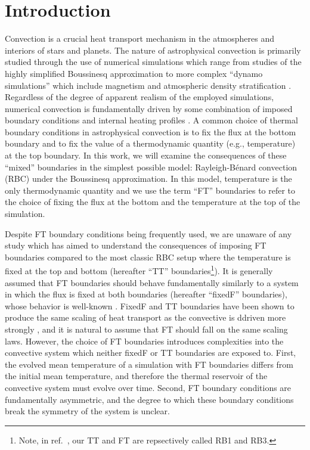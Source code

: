 \documentclass[aps, pre, onecolumn, nofootinbib, notitlepage, groupedaddress, amsfonts, amssymb, amsmath, longbibliography, superscriptaddress]{revtex4-1}
\newcommand{\RB}{Rayleigh-B\'{e}nard }
\begin{document}

\section{Introduction}
\label{sec:introduction}
Convection is a crucial heat transport mechanism in the atmospheres and interiors of stars and planets.
The nature of astrophysical convection is primarily studied through the use of numerical simulations which range from studies of the highly simplified Boussinesq approximation \cite{spiegel&veronis1960} to more complex ``dynamo simulations'' which include magnetism and atmospheric density stratification \cite{charbonneau2014, toomre2019}.
Regardless of the degree of apparent realism of the employed simulations, numerical convection is fundamentally driven by some combination of imposed boundary conditions and internal heating profiles \cite{goluskin2015}.
A common choice of thermal boundary conditions in astrophysical convection \cite{glatzmaier&gilman1982, hurlburt&all1986, cattaneo&all1990, featherstone&hindman2016a, korre&all2019, wood&brummell2018, kapyla&all2019} is to fix the flux at the bottom boundary and to fix the value of a thermodynamic quantity (e.g., temperature) at the top boundary.
In this work, we will examine the consequences of these ``mixed'' boundaries in the simplest possible model: \RB convection (RBC) under the Boussinesq approximation.
In this model, temperature is the only thermodynamic quantity and we use the term ``FT'' boundaries to refer to the choice of fixing the flux at the bottom and the temperature at the top of the simulation.

Despite FT boundary conditions being frequently used, we are unaware of any study which has aimed to understand the consequences of imposing FT boundaries compared to the most classic RBC setup where the temperature is fixed at the top and bottom (hereafter ``TT'' boundaries\footnote{Note, in ref.~\cite{goluskin2015}, our TT and FT are repsectively called RB1 and RB3.}).
It is generally assumed that FT boundaries should behave fundamentally similarly to a system in which the flux is fixed at both boundaries (hereafter ``fixedF'' boundaries), whose behavior is well-known \cite{otero&all2002, goluskin2015}.
FixedF and TT boundaries have been shown to produce the same scaling of heat transport as the convective is ddriven more strongly \cite{johnston&doering2009}, and it is natural to assume that FT should fall on the same scaling laws.
However, the choice of FT boundaries introduces complexities into the convective system which neither fixedF or TT boundaries are exposed to.
First, the evolved mean temperature of a simulation with FT boundaries differs from the initial mean temperature, and therefore the thermal reservoir of the convective system must evolve over time.
Second, FT boundary conditions are fundamentally asymmetric, and the degree to which these boundary conditions break the symmetry of the system is unclear.
\end{document}
